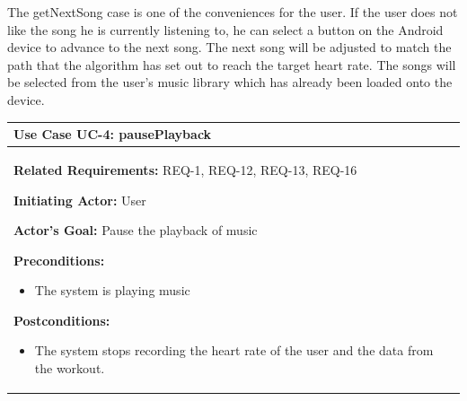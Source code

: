\documentclass[letterpaper,english, 12pt]{scrreprt}
\begin{document}
The getNextSong case is one of the conveniences for the user. If the user does not like the song he is currently listening to, he can select a button on the Android device to advance to the next song. The next song will be adjusted to match the path that the algorithm has set out to reach the target heart rate. The songs will be selected from the user's music library which has already been loaded onto the device.

\begin{center}
        \begin{tabular}{|C{15cm}|}
                \hline
                        \textbf{Use Case UC-4: pausePlayback}\\
                \hline
                        \begin{flushleft}
                                \textbf{Related Requirements: } REQ-1, REQ-12, REQ-13, REQ-16
                        \end{flushleft}
                        \begin{flushleft}
                                \textbf{Initiating Actor: } User
                        \end{flushleft}
                        \begin{flushleft}
                                \textbf{Actor's Goal: } Pause the playback of music
                        \end{flushleft}
                        \begin{flushleft}
                                \textbf{Preconditions: }
                        \end{flushleft}
                                \begin{itemize}
                                        \item The system is playing music
                                \end{itemize}
                        \begin{flushleft}
                                \textbf{Postconditions: }
                        \end{flushleft}
                                \begin{itemize}
                                        \item The system stops recording the heart rate of the user and the data from the workout.
                                \end{itemize}
                        \begin{flushleft}

\end{flushleft}
\end{tabular}
\end{center}
\end{document}
